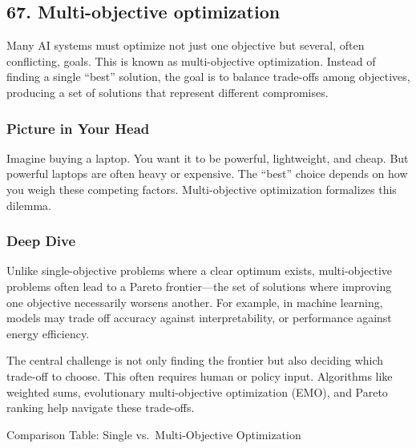 \documentclass[
  letterpaper,
  DIV=11,
  numbers=noendperiod]{scrreprt}
\begin{document}
\subsection{67. Multi-objective
optimization}\label{multi-objective-optimization}

Many AI systems must optimize not just one objective but several, often
conflicting, goals. This is known as multi-objective optimization.
Instead of finding a single ``best'' solution, the goal is to balance
trade-offs among objectives, producing a set of solutions that represent
different compromises.

\subsubsection{Picture in Your Head}\label{picture-in-your-head-66}

Imagine buying a laptop. You want it to be powerful, lightweight, and
cheap. But powerful laptops are often heavy or expensive. The ``best''
choice depends on how you weigh these competing factors. Multi-objective
optimization formalizes this dilemma.

\subsubsection{Deep Dive}\label{deep-dive-66}

Unlike single-objective problems where a clear optimum exists,
multi-objective problems often lead to a Pareto frontier---the set of
solutions where improving one objective necessarily worsens another. For
example, in machine learning, models may trade off accuracy against
interpretability, or performance against energy efficiency.

The central challenge is not only finding the frontier but also deciding
which trade-off to choose. This often requires human or policy input.
Algorithms like weighted sums, evolutionary multi-objective optimization
(EMO), and Pareto ranking help navigate these trade-offs.

Comparison Table: Single vs.~Multi-Objective Optimization
\end{document}
